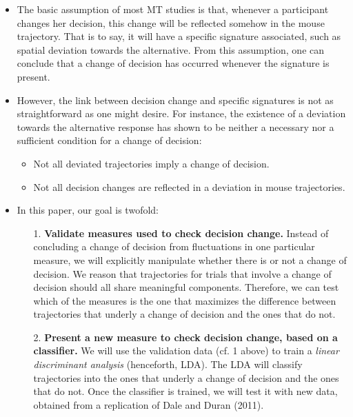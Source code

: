 \documentclass{article}
\begin{document}
\begin{itemize}

\item The basic assumption of most MT studies is that, whenever a participant changes her decision, this change will be reflected somehow in the mouse trajectory. That is to say, it will have a specific signature associated, such as spatial deviation towards the alternative. From this assumption, one can conclude that a change of decision has occurred whenever the signature is present. 

\item However, the link between decision change and specific signatures is not as straightforward as one might desire. For instance, the existence of a deviation towards the alternative response has shown to be neither a necessary nor a sufficient condition for a change of decision:

\begin{itemize}
\item Not all deviated trajectories imply a change of decision.
\item Not all decision changes are reflected in a deviation in mouse trajectories.
\end{itemize}

\item In this paper, our goal is twofold:

\begin{itemize}
\item[1.] \textbf{Validate measures used to check decision change.} 
Instead of concluding a change of decision from fluctuations in one particular measure, we will explicitly manipulate whether there is or not a change of decision. We reason that trajectories for trials that involve a change of decision should all share meaningful components. Therefore, we can test which of the measures is the one that maximizes the difference between trajectories that underly a change of decision and the ones that do not.

\item[2.] \textbf{Present a new measure to check decision change, based on a classifier.} We will use the validation data (cf. 1 above) to train a \emph{linear discriminant analysis} (henceforth, LDA). The LDA will classify trajectories into the ones that underly a change of decision and the ones that do not. Once the classifier is trained, we will test it with new data, obtained from a replication of Dale and Duran (2011).   


\end{itemize}
\end{itemize}
\end{document}
